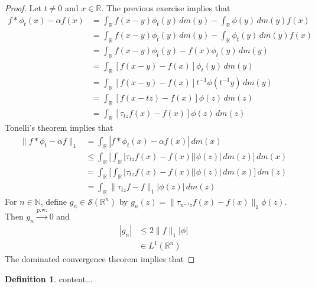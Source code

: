 \documentclass[12pt]{amsart}
\theoremstyle{definition}
\newtheorem{defn}[definition]{Definition}
\newcommand{\al}{\alpha}
\newcommand{\N}{\mathbb{N}}
\newcommand{\R}{\mathbb{R}}
\newcommand{\MS}{\mathcal{S}}
\newcommand{\dm}{\, d m}
\newcommand{\convt}[1]{\xrightarrow{\text{#1}}}
\begin{document}
	\begin{proof}
		Let $t \neq 0$ and $x \in \R$. The previous exercise implies that 
		\begin{align*}
			f * \phi_t(x) - \al f(x) 
			& = \int_{\R} f(x-y) \phi_t(y) \dm(y) - \int_{\R} \phi(y) \dm(y) f(x) \\
			& = \int_{\R} f(x-y) \phi_t(y) \dm(y) - \int_{\R} \phi_t(y) \dm(y) f(x) \\
			& = \int_{\R} f(x-y) \phi_t(y)  -  f(x) \phi_t(y) \dm(y) \\
			& = \int_{\R} [f(x-y)  -  f(x)] \phi_t(y) \dm(y) \\
			& = \int_{\R} [f(x-y)  -  f(x)] t^{-1}\phi(t^{-1}y) \dm(y) \\
			& = \int_{\R} [f(x-tz)  -  f(x)] \phi(z) \dm(z) \\
			& = \int_{\R} [\tau_{tz}f(x) -  f(x)] \phi(z) \dm(z)   
		\end{align*}
		Tonelli's theorem implies that 
		\begin{align*}
			\|f * \phi_t - \al f \|_1
			& = \int_{\R}|f * \phi_t(x) - \al f(x) | \dm(x) \\
			& \leq \int_{\R} \bigg[ \int_{\R} |\tau_{tz}f(x)  -  f(x)| |\phi(z)| \dm(z) \bigg] \dm(x) \\
			& =  \int_{\R} \bigg[ \int_{\R} |\tau_{tz}f(x)  -  f(x)| |\phi(z)| \dm(x) \bigg] \dm(z) \\
			& = \int_{\R} \|\tau_{tz}f - f\|_1|\phi(z)| \dm(z)
		\end{align*}
		For $n \in \N$, define $g_n \in \MS(\R^n)$ by $g_n(z) = \|\tau_{n^{-1}z}f(x)  -  f(x)\|_1 \phi(z)$. Then $g_n \convt{p.w.} 0$ and 
		\begin{align*}
			|g_n| 
			& \leq 2\|f\|_1|\phi| \\
			& \in L^1(\R^n)
		\end{align*} 
		The dominated convergence theorem implies that 
		
	\end{proof}

	
	


	\begin{defn}
		content...
	\end{defn}
	
	
	
	
	
	
	
	
	
	
	
	
	
	
	
\end{document}
